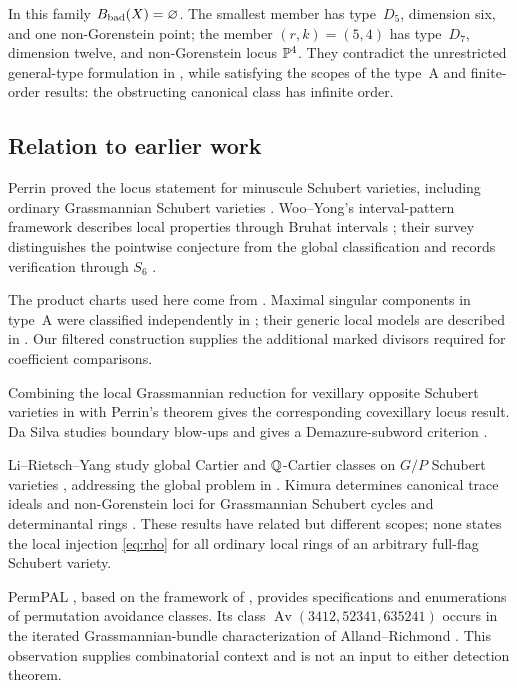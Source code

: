 In this family $B_{\mathrm{bad}}(X)=\varnothing$. The smallest member has type~$D_5$, dimension six, and one non-Gorenstein point; the member $(r,k)=(5,4)$ has type~$D_7$, dimension twelve, and non-Gorenstein locus $\mathbb P^4$. They contradict the unrestricted general-type formulation in \cite[Conjecture~0.1]{Per09}, while satisfying the scopes of the type~A and finite-order results: the obstructing canonical class has infinite order.

\subsection{Relation to earlier work}
Perrin proved the locus statement for minuscule Schubert varieties, including ordinary Grassmannian Schubert varieties \cite[Theorem~0.3 and Corollary~0.4]{Per09}. Woo--Yong's interval-pattern framework describes local properties through Bruhat intervals \cite{WY08}; their survey distinguishes the pointwise conjecture from the global classification and records verification through $S_6$ \cite[Conjecture~7.31 and Exercise~7.32]{WY23}.

The product charts used here come from \cite{WY08,KWY13}. Maximal singular components in type~A were classified independently in \cite{BW03,Cor03,KLR03,Man01b}; their generic local models are described in \cite{Cor03,Man01a}. Our filtered construction supplies the additional marked divisors required for coefficient comparisons.

Combining the local Grassmannian reduction for vexillary opposite Schubert varieties in \cite[Theorem~7.1 and Section~5]{AIJK23} with Perrin's theorem gives the corresponding covexillary locus result. Da Silva studies boundary blow-ups and gives a Demazure-subword criterion \cite[Theorem~0.2 and Corollary~0.7]{DS19}.

Li--Rietsch--Yang study global Cartier and $\mathbb Q$-Cartier classes on $G/P$ Schubert varieties \cite{LRY25}, addressing the global problem in \cite[Problem~8.24]{WY23}. Kimura determines canonical trace ideals and non-Gorenstein loci for Grassmannian Schubert cycles and determinantal rings \cite{Kim26}. These results have related but different scopes; none states the local injection \eqref{eq:rho} for all ordinary local rings of an arbitrary full-flag Schubert variety.

PermPAL \cite{PermPAL}, based on the framework of \cite{ABC26}, provides specifications and enumerations of permutation avoidance classes. Its class $\operatorname{Av}(3412,52341,635241)$ occurs in the iterated Grassmannian-bundle characterization of Alland--Richmond \cite{AR18}. This observation supplies combinatorial context and is not an input to either detection theorem.

